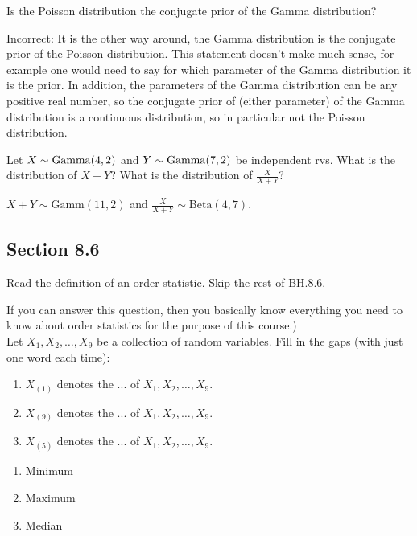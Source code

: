 \begin{exercise}
Is the Poisson distribution  the conjugate prior of the Gamma distribution?
\begin{solution}
Incorrect: It is the other way around, the Gamma distribution is the conjugate prior of the Poisson distribution. This statement doesn't make much sense, for example one would need to say for which parameter of the Gamma distribution it is the prior. In addition, the parameters of the Gamma distribution can be any positive real number, so the conjugate prior of (either parameter) of the Gamma distribution is a continuous distribution, so in particular not the Poisson distribution.
\end{solution}
\end{exercise}

\begin{exercise}
Let $X \sim \mathrm{Gamma}(4,2)$ and $Y \sim \mathrm{Gamma}(7,2)$ be independent rvs. What is the distribution of $X+Y$? What is the distribution of $\frac{X}{X+Y}$?

\begin{solution}
$X+Y \sim \text{Gamm}(11,2)$ and $\frac{X}{X+Y} \sim \text{Beta}(4,7)$.
\end{solution}
\end{exercise}





\subsection*{Section 8.6}
\label{sec:section-8.6}

Read the definition of an order statistic. Skip the rest of BH.8.6.

\begin{exercise}
If you can answer this question, then you basically know everything you need to know about order statistics for the purpose of this course.)\\
Let $X_1,X_2,\ldots,X_9$ be a collection of random variables. Fill in the gaps (with just one word each time):
\begin{enumerate}
    \item $X_{(1)}$ denotes the ... of $X_1,X_2,\ldots,X_9$.
    \item $X_{(9)}$ denotes the ... of $X_1,X_2,\ldots,X_9$.
    \item $X_{(5)}$ denotes the ... of $X_1,X_2,\ldots,X_9$.
\end{enumerate}
\begin{solution}
\begin{enumerate}
    \item Minimum
    \item Maximum
    \item Median
\end{enumerate}
\end{solution}
\end{exercise}



